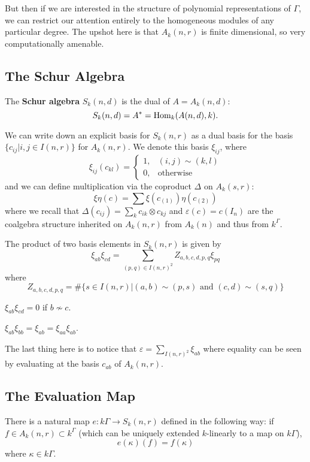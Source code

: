 \documentclass[12pt]{article}
\DeclareMathOperator{\1}{\mathbbm{1}}
\begin{document}
But then if we are interested in the structure of polynomial representations of $\Gamma$, we can restrict our attention entirely to the homogeneous modules
of any particular degree. The upshot here is that $A_k(n,r)$ is finite dimensional, so very computationally amenable.

\subsection{The Schur Algebra}
\begin{defn}
	The \textbf{Schur algebra} $S_k(n,d)$ is the dual of $A=A_k(n,d):$
	\[S_k(n,d)=A^\ast=\operatorname{Hom}_k(A(n,d),k).\]
\end{defn}

We can write down an explicit basis for $S_k(n,r)$ as a dual basis for the basis $\{c_{ij}|i,j\in I(n,r)\}$ for $A_k(n,r)$. We denote this basis $\xi_{ij}$, where 
\[\xi_{ij}(c_{kl})=\begin{cases}
	1,& (i,j)\sim (k,l)\\
	0,&\text{otherwise}
\end{cases}\]
and we can define multiplication via the coproduct $\Delta$ on $A_k(s,r)$:
\[\xi\eta(c)=\sum \xi(c_{(1)})\eta(c_{(2)})\]
where we recall that $\Delta(c_{ij})=\sum_k c_{ik}\otimes c_{kj}$ and $\varepsilon(c)=c(I_n)$ are the coalgebra structure inherited on $A_k(n,r)$ 
from $A_k(n)$ and thus from $k^\Gamma$.

\begin{prop}
	The product of two basis elements in $S_k(n,r)$ is given by 
	\[\xi_{ab}\xi_{cd}=\sum_{(p,q)\in I(n,r)^2}Z_{a,b,c,d,p,q}\xi_{pq}\]
	where 
	\[Z_{a,b,c,d,p,q}=\#\{s\in I(n,r)|(a,b)\sim(p,s)\text{ and }(c,d)\sim(s,q)\}\]
\end{prop}
\begin{cor}
	$\xi_{ab}\xi_{cd}=0$ if $b\not\sim c$.
\end{cor}
\begin{cor}\label{cor:idempotent}
	$\xi_{ab}\xi_{bb}=\xi_{ab}=\xi_{aa}\xi_{ab}$.
\end{cor}

The last thing here is to notice that $\varepsilon=\sum_{I(n,r)^2}\xi_{ab}$ where equality can be seen by evaluating at the basis $c_{ab}$ of $A_k(n,r)$.

\subsection{The Evaluation Map}
There is a natural map $e:k\Gamma\to S_k(n,r)$ defined in the following way: if $f\in A_k(n,r)\subset k^\Gamma$ (which can be uniquely extended $k$-linearly 
to a map on $k\Gamma$),
\[e(\kappa)(f)=f(\kappa)\]
where $\kappa\in k\Gamma$.
\end{document}
